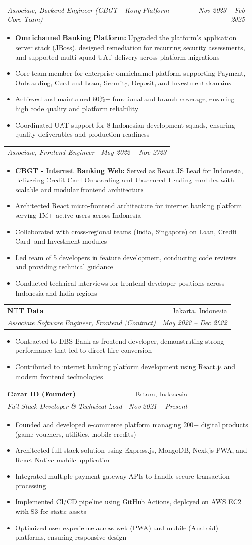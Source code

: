 \documentclass[letterpaper,11pt]{article}
\makeatletter
\newcommand{\resumeItem}[1]{
  \item\small{
    {#1 \vspace{-2pt}}
  }
}
\newcommand{\resumeSubheading}[4]{
  \vspace{-2pt}\item
    \begin{tabular*}{0.97\textwidth}[t]{l@{\extracolsep{\fill}}r}
      \textbf{#1} & #2 \\
      \textit{\small#3} & \textit{\small #4} \\
    \end{tabular*}\vspace{-7pt}
}
\newcommand{\resumeSubSubheading}[2]{
    \item
    \begin{tabular*}{0.97\textwidth}{l@{\extracolsep{\fill}}r}
      \textit{\small#1} & \textit{\small #2} \\
    \end{tabular*}\vspace{-7pt}
}
\newcommand{\resumeItemListStart}{\begin{itemize}}
\newcommand{\resumeItemListEnd}{\end{itemize}\vspace{-5pt}}
\makeatother
\begin{document}
    \resumeSubSubheading
      {Associate, Backend Engineer (CBGT - Kony Platform Core Team)}{Nov 2023 -- Feb 2025}
        \resumeItemListStart
            \resumeItem{\textbf{Omnichannel Banking Platform:} Upgraded the platform's application server stack (JBoss), designed remediation for recurring security assessments, and supported multi-squad UAT delivery across platform migrations}
            \resumeItem{Core team member for enterprise omnichannel platform supporting Payment, Onboarding, Card and Loan, Security, Deposit, and Investment domains}
            \resumeItem{Achieved and maintained 80\%+ functional and branch coverage, ensuring high code quality and platform reliability}
            \resumeItem{Coordinated UAT support for 8 Indonesian development squads, ensuring quality deliverables and production readiness}
        \resumeItemListEnd

    \resumeSubSubheading
      {Associate, Frontend Engineer}{May 2022 -- Nov 2023}
        \resumeItemListStart
            \resumeItem{\textbf{CBGT - Internet Banking Web:} Served as React JS Lead for Indonesia, delivering Credit Card Onboarding and Unsecured Lending modules with scalable and modular frontend architecture}
            \resumeItem{Architected React micro-frontend architecture for internet banking platform serving 1M+ active users across Indonesia}
            \resumeItem{Collaborated with cross-regional teams (India, Singapore) on Loan, Credit Card, and Investment modules}
            \resumeItem{Led team of 5 developers in feature development, conducting code reviews and providing technical guidance}
            \resumeItem{Conducted technical interviews for frontend developer positions across Indonesia and India regions}
        \resumeItemListEnd

    \resumeSubheading
      {NTT Data}{Jakarta, Indonesia}
      {Associate Software Engineer, Frontend (Contract)}{May 2022 -- Dec 2022}
        \resumeItemListStart
            \resumeItem{Contracted to DBS Bank as frontend developer, demonstrating strong performance that led to direct hire conversion}
            \resumeItem{Contributed to internet banking platform development using React.js and modern frontend technologies}
        \resumeItemListEnd

    \resumeSubheading
      {Garar ID (Founder)}{Batam, Indonesia}
      {Full-Stack Developer \& Technical Lead}{Nov 2021 -- Present}
        \resumeItemListStart
            \resumeItem{Founded and developed e-commerce platform managing 200+ digital products (game vouchers, utilities, mobile credits)}
            \resumeItem{Architected full-stack solution using Express.js, MongoDB, Next.js PWA, and React Native mobile application}
            \resumeItem{Integrated multiple payment gateway APIs to handle secure transaction processing}
            \resumeItem{Implemented CI/CD pipeline using GitHub Actions, deployed on AWS EC2 with S3 for static assets}
            \resumeItem{Optimized user experience across web (PWA) and mobile (Android) platforms, ensuring responsive design}
        \resumeItemListEnd
\end{document}

